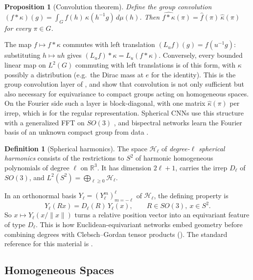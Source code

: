 \documentclass[11pt]{article}
\theoremstyle{plain}
\newtheorem{Proposition}{Proposition}[section]
\theoremstyle{definition}
\newtheorem{Definition}{Definition}[section]
\begin{document}
\begin{Proposition}[Convolution theorem]\label{prop:convolution-theorem}
Define the group convolution $(f*\kappa)(g) = \int_G f(h)\,\kappa(h^{-1}g)\,d\mu(h)$. Then $\widehat{f*\kappa}(\pi) = \widehat{f}(\pi)\,\widehat{\kappa}(\pi)$ for every $\pi\in\widehat{G}$.
\end{Proposition}

The map $f\mapsto f*\kappa$ commutes with left translation $(L_uf)(g) = f(u^{-1}g)$: substituting $h\mapsto uh$ gives $(L_uf)*\kappa = L_u(f*\kappa)$.
Conversely, every bounded linear map on $L^2(G)$ commuting with left translations is of this form, with $\kappa$ possibly a distribution (e.g.\ the Dirac mass at $e$ for the identity).
This is the group convolution layer of \citet{cohen2016}, and \citet{kondor2018p3icml} show that convolution is not only sufficient but also necessary for equivariance to compact groups acting on homogeneous spaces.
On the Fourier side such a layer is block-diagonal, with one matrix $\widehat{\kappa}(\pi)$ per irrep, which is  for the regular representation.
Spherical CNNs use this structure with a generalized FFT on $SO(3)$ \citep{cohen2018}, and bispectral networks learn the Fourier basis of an unknown compact group from data \citep{sanborn2022}.

\begin{Definition}[Spherical harmonics]\label{def:spherical-harmonics}
The space $\mathcal{H}_\ell$ of \emph{degree-$\ell$ spherical harmonics} consists of the restrictions to $S^2$ of harmonic homogeneous polynomials of degree $\ell$ on $\mathbb{R}^3$.
It has dimension $2\ell+1$, carries the irrep $D_\ell$ of $SO(3)$, and $L^2(S^2) = \bigoplus_{\ell\geq 0}\mathcal{H}_\ell$.
\end{Definition}

In an orthonormal basis $Y_\ell = (Y_\ell^m)_{m=-\ell}^{\ell}$ of $\mathcal{H}_\ell$, the defining property is
\[
    Y_\ell(Rx) = D_\ell(R)\,Y_\ell(x), \qquad R\in SO(3),\ x\in S^2 .
\]
So $x\mapsto Y_\ell(x/\lVert x\rVert)$ turns a relative position vector into an equivariant feature of type $D_\ell$.
This is how Euclidean-equivariant networks embed geometry before combining degrees with Clebsch--Gordan tensor products ().
The standard reference for this material is \citet{folland2016}.


\subsection{Homogeneous Spaces}
\label{subsec:homogeneous-spaces}
\end{document}
